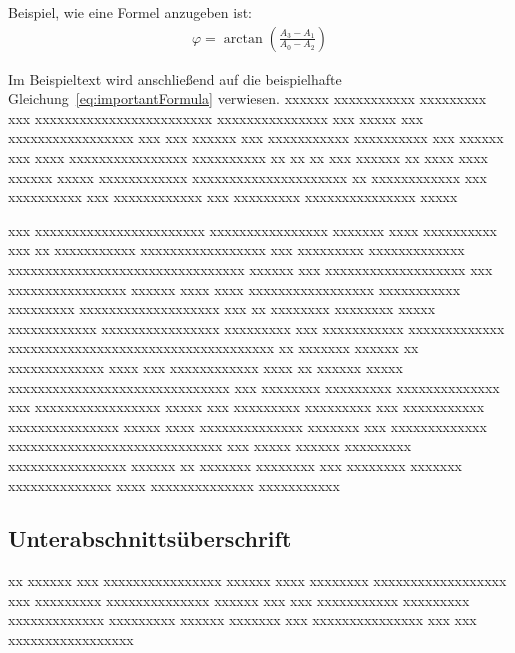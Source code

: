Beispiel, wie eine Formel anzugeben ist:
\begin{align}
   \varphi=\arctan\left(\frac{A_3-A_1}{A_0-A_2}\right)
	\label{eq:importantFormula}
\end{align}

Im Beispieltext wird anschließend auf die beispielhafte Gleichung~\eqref{eq:importantFormula} verwiesen.
xxxxxx xxxxxxxxxxx xxxxxxxxx xxx xxxxxxxxxxxxxxxxxxxxxxxx xxxxxxxxxxxxxxx xxx xxxxx xxx xxxxxxxxxxxxxxxxx xxx xxx xxxxxx xxx xxxxxxxxxxx xxxxxxxxxx xxx xxxxxx xxx xxxx xxxxxxxxxxxxxxxx xxxxxxxxxx xx xx xx xxx xxxxxx xx xxxx xxxx xxxxxx xxxxx xxxxxxxxxxxx xxxxxxxxxxxxxxxxxxxxx xx xxxxxxxxxxxx xxx xxxxxxxxxx xxx xxxxxxxxxxxx xxx xxxxxxxxx xxxxxxxxxxxxxxx xxxxx
%

xxx xxxxxxxxxxxxxxxxxxxxxxx xxxxxxxxxxxxxxxx xxxxxxx xxxx xxxxxxxxxx xxx xx xxxxxxxxxxx xxxxxxxxxxxxxxxxx xxx xxxxxxxxx xxxxxxxxxxxxx xxxxxxxxxxxxxxxxxxxxxxxxxxxxxxxx xxxxxx xxx xxxxxxxxxxxxxxxxxxx xxx xxxxxxxxxxxxxxxx xxxxxx xxxx xxxx xxxxxxxxxxxxxxxxx xxxxxxxxxxx xxxxxxxxx xxxxxxxxxxxxxxxxxxx xxx xx xxxxxxxx xxxxxxxx xxxxx xxxxxxxxxxxx xxxxxxxxxxxxxxxx xxxxxxxxx xxx xxxxxxxxxxx xxxxxxxxxxxxx xxxxxxxxxxxxxxxxxxxxxxxxxxxxxxxxxxxx xx xxxxxxx xxxxxx xx xxxxxxxxxxxxx xxxx xxx xxxxxxxxxxxx xxxx xx xxxxxx xxxxx xxxxxxxxxxxxxxxxxxxxxxxxxxxxxx xxx xxxxxxxx xxxxxxxxx xxxxxxxxxxxxxx xxx xxxxxxxxxxxxxxxxx xxxxx xxx xxxxxxxxx xxxxxxxxx xxx xxxxxxxxxxx xxxxxxxxxxxxxxx xxxxx xxxx xxxxxxxxxxxxxx xxxxxxx xxx xxxxxxxxxxxxx xxxxxxxxxxxxxxxxxxxxxxxxxxxxx xxx xxxxx xxxxxx xxxxxxxxx xxxxxxxxxxxxxxxx xxxxxx xx xxxxxxx xxxxxxxx xxx xxxxxxxx xxxxxxx xxxxxxxxxxxxxx xxxx xxxxxxxxxxxxxx xxxxxxxxxxx

\subsection{Unterabschnittsüberschrift}\label{sec:xxx}
xx xxxxxx xxx xxxxxxxxxxxxxxxx xxxxxx xxxx xxxxxxxx xxxxxxxxxxxxxxxxxx xxx xxxxxxxxx xxxxxxxxxxxxxx xxxxxx xxx xxx xxxxxxxxxxx xxxxxxxxx xxxxxxxxxxxxx xxxxxxxxx xxxxxx xxxxxxx xxx xxxxxxxxxxxxxxx xxx xxx \cite{KEYA} xxxxxxxxxxxxxxxxx
